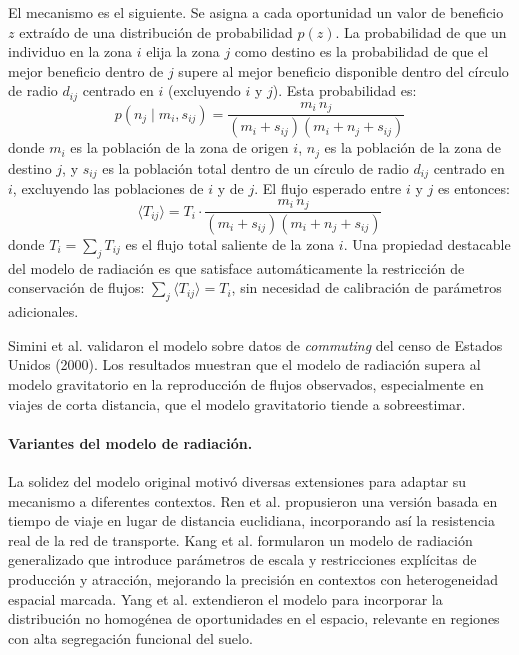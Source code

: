 El mecanismo es el siguiente. Se asigna a cada oportunidad un valor de beneficio $z$ extraído de una distribución de probabilidad $p(z)$. La probabilidad de que un individuo en la zona $i$ elija la zona $j$ como destino es la probabilidad de que el mejor beneficio dentro de $j$ supere al mejor beneficio disponible dentro del círculo de radio $d_{ij}$ centrado en $i$ (excluyendo $i$ y $j$). Esta probabilidad es:
\begin{equation}
    p(n_j \mid m_i, s_{ij}) = \frac{m_i \, n_j}{(m_i + s_{ij})(m_i + n_j + s_{ij})}
    \label{eq:radiacion}
\end{equation}
donde $m_i$ es la población de la zona de origen $i$, $n_j$ es la población de la zona de destino $j$, y $s_{ij}$ es la población total dentro de un círculo de radio $d_{ij}$ centrado en $i$, excluyendo las poblaciones de $i$ y de $j$. El flujo esperado entre $i$ y $j$ es entonces:
\begin{equation}
    \langle T_{ij} \rangle = T_i \cdot \frac{m_i \, n_j}{(m_i + s_{ij})(m_i + n_j + s_{ij})}
    \label{eq:radiacion_flujo}
\end{equation}
donde $T_i = \sum_j T_{ij}$ es el flujo total saliente de la zona $i$. Una propiedad destacable del modelo de radiación es que satisface automáticamente la restricción de conservación de flujos: $\sum_j \langle T_{ij} \rangle = T_i$, sin necesidad de calibración de parámetros adicionales.

Simini et al. \cite{simini2012universal} validaron el modelo sobre datos de \textit{commuting} del censo de Estados Unidos (2000). Los resultados muestran que el modelo de radiación supera al modelo gravitatorio en la reproducción de flujos observados, especialmente en viajes de corta distancia, que el modelo gravitatorio tiende a sobreestimar.

\paragraph{Variantes del modelo de radiación.} La solidez del modelo original motivó diversas extensiones para adaptar su mecanismo a diferentes contextos. Ren et al. \cite{ren2014predicting} propusieron una versión basada en tiempo de viaje en lugar de distancia euclidiana, incorporando así la resistencia real de la red de transporte. Kang et al. \cite{kang2015generalized} formularon un modelo de radiación generalizado que introduce parámetros de escala y restricciones explícitas de producción y atracción, mejorando la precisión en contextos con heterogeneidad espacial marcada. Yang et al. \cite{yang2014limits} extendieron el modelo para incorporar la distribución no homogénea de oportunidades en el espacio, relevante en regiones con alta segregación funcional del suelo.

